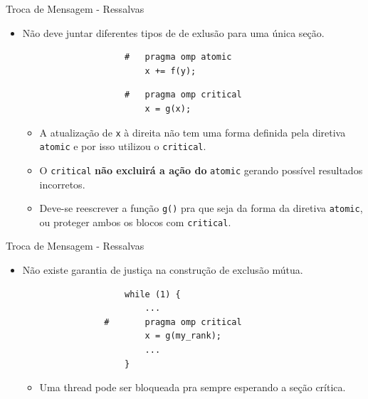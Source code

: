 	\begin{frame}[fragile]{Troca de Mensagem - Ressalvas}
		\begin{itemize}
			\item Não deve juntar diferentes tipos de de exlusão para uma única seção.
			\begin{multicols}{2}
				\begin{verbatim}
					#	pragma omp atomic
						x += f(y);
				\end{verbatim}
			\columnbreak
				\begin{verbatim}
					#	pragma omp critical
						x = g(x);
				\end{verbatim}
			\end{multicols}
			\begin{itemize}
				\item A atualização de {\tt x} à direita não tem uma forma definida pela diretiva {\tt atomic} e por isso utilizou o {\tt critical}.
				\item O {\tt critical} \textbf{não excluirá a ação do} {\tt atomic} gerando possível resultados incorretos.
				\item Deve-se reescrever a função {\tt g()} pra que seja da forma da diretiva {\tt atomic}, ou proteger ambos os blocos com {\tt critical}.
			\end{itemize}
		\end{itemize}
\end{frame}

	\begin{frame}[fragile]{Troca de Mensagem - Ressalvas}
		\begin{itemize}
			\item Não existe garantia de justiça na construção de exclusão mútua.
			\begin{verbatim}
					while (1) {
						...
				#		pragma omp critical
						x = g(my_rank);
						...
					}
			\end{verbatim}
			\begin{itemize}
				\item Uma thread pode ser bloqueada pra sempre esperando a seção crítica.
			\end{itemize}
		\end{itemize}
\end{frame}

